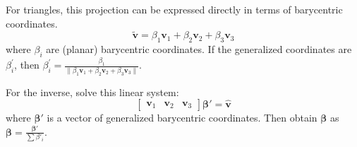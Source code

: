 \documentclass{amsart}[12pt]
\begin{document}
For triangles, this projection can be expressed directly in terms
of barycentric coordinates.
\begin{equation}
   \widetilde{\mathbf v} =
   \beta_1 \mathbf v_1 + \beta_2 \mathbf v_2 + \beta_3 \mathbf v_3
\end{equation}
where $\beta_i$ are (planar) barycentric coordinates. If the generalized coordinates are $\beta^\prime_i$, then $\beta^\prime_i = \frac{\beta_1}
{\|\beta_1 \mathbf v_1 + \beta_2 \mathbf v_2 + \beta_3 \mathbf v_3\|}$.

For the inverse, solve this linear system:
\begin{equation}
  \begin{bmatrix}
  \mathbf v_1 & \mathbf v_2 & \mathbf v_3 \end{bmatrix}
   \mathbf{\beta'} = \hat{\mathbf v}
\end{equation}
where $\mathbf{\beta'}$ is a
vector of generalized barycentric coordinates. Then obtain $\mathbf{\beta}$ as
$\mathbf{\beta} = \frac{\mathbf{\beta'}}{\sum{\beta'_i}}$.
\end{document}
